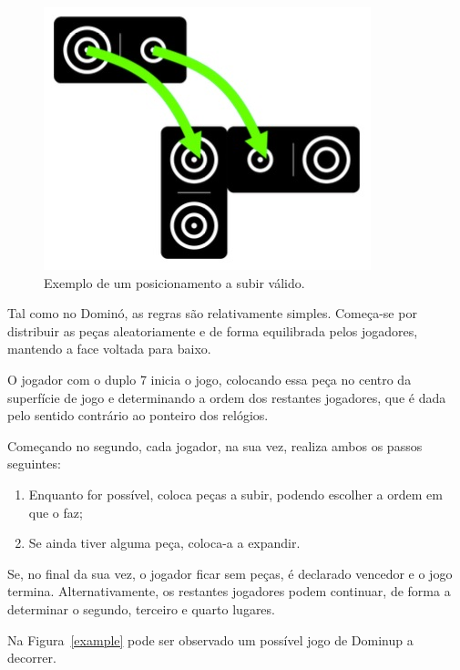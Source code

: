 \documentclass[a4paper]{article}
\begin{document}
\begin{figure}[htbp]
\begin{center}
\includegraphics[scale=0.3]{climb.jpg}
\caption{Exemplo de um posicionamento a subir válido.}
\label{climb}
\end{center}
\end{figure}

Tal como no Dominó, as regras são relativamente simples. Começa-se por distribuir as peças aleatoriamente e de forma equilibrada pelos jogadores, mantendo a face voltada para baixo. 

O jogador com o duplo 7 inicia o jogo, colocando essa peça no centro da superfície de jogo e determinando a ordem dos restantes jogadores, que é dada pelo sentido contrário ao ponteiro dos relógios. 

Começando no segundo, cada jogador, na sua vez, realiza ambos os passos seguintes:
\begin{enumerate}
	\item Enquanto for possível, coloca peças a subir, podendo escolher a ordem em que o faz;
	\item Se ainda tiver alguma peça, coloca-a a expandir.
\end{enumerate}

Se, no final da sua vez, o jogador ficar sem peças, é declarado vencedor e o jogo termina. Alternativamente, os restantes jogadores podem continuar, de forma a determinar o segundo, terceiro e quarto lugares.

Na Figura~\ref{example} pode ser observado um possível jogo de Dominup a decorrer.
\end{document}
